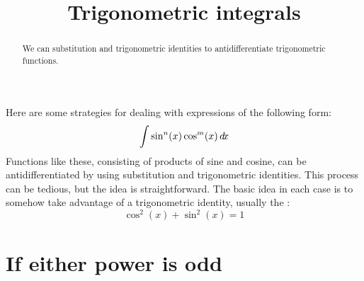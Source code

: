 \documentclass{ximera}
\title[Dig-In:]{Trigonometric integrals}
\begin{document}
\begin{abstract}
  We can substitution and trigonometric identities to antidifferentiate
  trigonometric functions.
\end{abstract}
\maketitle

Here are some strategies for dealing with expressions of the following
form:
\[
\int \sin^n(x)\cos^m(x) \mathop{}\!d\! x
\]
Functions like these, consisting of products of sine and cosine, can
be antidifferentiated by using substitution and trigonometric
identities. This process can be tedious, but the idea is
straightforward. The basic idea in each case is to somehow take
advantage of a trigonometric identity, usually the :
\[
\cos^2(x) + \sin^2(x) = 1
\]

\section{If either power is odd}
\end{document}
